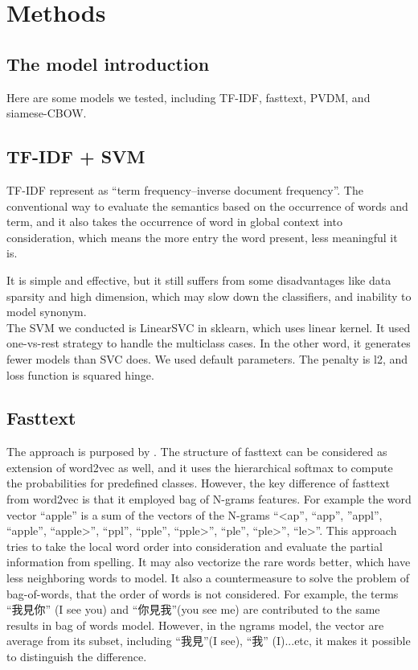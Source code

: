 \chapter{Methods}

\section{The model introduction}

Here are some models we tested, including TF-IDF, fasttext, PVDM, and siamese-CBOW.

\section{TF-IDF + SVM}

	TF-IDF represent as \enquote{term frequency–inverse document frequency}. The conventional way to evaluate the semantics based on the occurrence of words and term, 
  and it also takes the occurrence of word in global context into consideration, which means the more entry the word present, less meaningful it is.

  It is simple and effective, but it still suffers from some disadvantages like data sparsity and high dimension, which may slow down the classifiers, and inability to model synonym. \\

  The SVM we conducted is LinearSVC in sklearn, which uses linear kernel. It used one-vs-rest strategy to handle the multiclass cases.
  In the other word, it generates fewer models than SVC does.
  We used default parameters. The penalty is l2, and loss function is squared hinge. 

\section{Fasttext}
	
The approach is purposed by \cite{joulin2016fasttext}. 
The structure of fasttext can be considered as extension of word2vec as well, and it uses the hierarchical softmax to compute the probabilities for predefined classes. 
However, the key difference of fasttext from word2vec is that it employed bag of N-grams features. 
For example the word vector “apple” is a sum of the vectors of the N-grams “\textless ap”, “app”, ”appl”, “apple”, “apple\textgreater”, “ppl”, “pple”, “pple\textgreater”, “ple”, “ple\textgreater”, “le\textgreater”.
This approach tries to take the local word order into consideration and evaluate the partial information from spelling. It may also vectorize the rare words better, which have less neighboring words to model.
It also a countermeasure to solve the problem of bag-of-words, that the order of words is not considered. 
For example, the terms \enquote{我見你} (I see you) and \enquote{你見我}(you see me) are contributed to the same results in bag of words model.
However, in the ngrams model, the vector are average from its subset, including \enquote{我見}(I see), \enquote{我} (I)...etc, it makes it possible to distinguish the difference.

